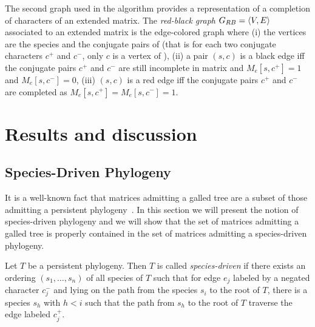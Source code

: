 




The second graph used in the algorithm provides a representation of a  completion of characters of an extended matrix.
The \emph{red-black graph} $G_{RB}=\langle V,E \rangle$  associated to an extended matrix \me
is the edge-colored graph where (i)
the vertices are the species and the conjugate pairs of \me (that is
for each two conjugate
characters $c^{+}$ and $c^{-}$, only $c$ is a vertex of \grb), (ii) a pair $(s,c)$
is a black edge iff the conjugate pairs
$c^{+}$ and $c^{-}$ are still incomplete in matrix \me and
$M_e[s,c^{+}]=1$ and
$M_e[s,c^{-}]=0$, (iii)
$(s,c)$ is a red edge iff the conjugate pairs
$c^{+}$ and $c^{-}$ are completed as $M_e[s,c^{+}]=M_e[s,c^{-}]=1$.


\section*{Results and discussion}


\subsection*{Species-Driven Phylogeny}

It is a well-known fact that matrices admitting a galled tree are a
subset of those admitting a persistent phylogeny~\cite{gusfield_optimal_2004}.
In this section we will present the notion of species-driven phylogeny
and we will show that the set of  matrices admitting a galled tree is
properly contained in the set of matrices admitting a species-driven phylogeny.


\begin{definition}
\label{definition:species-driven}
Let $T$ be a persistent phylogeny.
Then $T$ is called \emph{species-driven} if there exists an ordering
$(s_{1}, \ldots , s_{n})$ of all species of $T$ such that for edge $e_{j}$
labeled by a negated character $c_{j}^{-}$  and lying on the path from
the species $s_{i}$ to the root of $T$, there is a species $s_{h}$
with $h < i$ such that the path from $s_{h}$ to the root of $T$
traverse the edge labeled $c_{j}^{+}$.
\end{definition}

